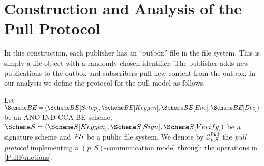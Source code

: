 \section{Construction and Analysis of the Pull Protocol}
\label{PullAnalysis}

In this construction, each publisher has an \enquote{outbox} file in the file 
system.
This is simply a file object with a randomly chosen identifier.
The publisher adds new publications to the outbox and subscribers pull new 
content from the outbox.
In our analysis we define the protocol for the pull model as follows.

\begin{definition}\label{PullModel}
  Let \(\BE = (\BE[Setup],\allowbreak \BE[Keygen],\allowbreak 
    \BE[Enc],\allowbreak \BE[Dec])\) be an ANO-IND-CCA \ac{BE} scheme,
  \(\S = (\S[Keygen], \S[Sign], \S[Verify])\) be a signature scheme and \(\FS\) 
  be a public file system.
  We denote by \(\Pull[p, S]\) the \emph{pull protocol} implementing a \((p, 
    S)\)-communication model through the operations in \cref{PullFunctions}.
\end{definition}

